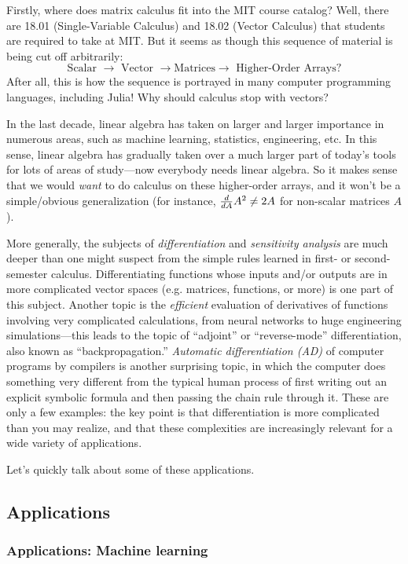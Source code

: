 Firstly, where does matrix calculus fit into the MIT course catalog? Well, there are 18.01 (Single-Variable Calculus) and 18.02 (Vector Calculus) that students are required to take at MIT. But it seems as though this sequence of material is being cut off arbitrarily:
\[
\text{Scalar }\to \text{ Vector }\to \text{Matrices}  \to \text{ Higher-Order Arrays?}
\]
After all, this is how the sequence is portrayed in many computer programming languages, including Julia!  Why should calculus stop with vectors?

In the last decade, linear algebra has taken on larger and larger importance in numerous areas, such as machine learning, statistics, engineering, etc. In this sense, linear algebra has gradually taken over a much larger part of today's tools for lots of areas of study---now everybody needs linear algebra. So it makes sense that we would \textit{want} to do calculus on these higher-order arrays, and it won't be a simple/obvious generalization (for instance, $\frac{d}{d A} A^2 \neq 2A$ for non-scalar matrices $A$).

More generally, the subjects of \emph{differentiation} and \emph{sensitivity analysis} are much deeper than one might suspect from the simple rules learned in first- or second-semester calculus.  Differentiating functions whose inputs and/or outputs are in more complicated vector spaces (e.g. matrices, functions, or more) is one part of this subject.  Another topic is the \emph{efficient} evaluation of derivatives of functions involving very complicated calculations, from neural networks to huge engineering simulations---this leads to the topic of ``adjoint'' or ``reverse-mode'' differentiation, also known as ``backpropagation.''  \emph{Automatic differentiation (AD)} of computer programs by compilers is another surprising topic, in which the computer does something very different from the typical human process of first writing out an explicit symbolic formula and then passing the chain rule through it.   These are only a few examples: the key point is that differentiation is more complicated than you may realize, and that these complexities are increasingly relevant for a wide variety of applications.
 
Let's quickly talk about some of these applications.

\subsection{Applications}

\subsubsection*{Applications: Machine learning}

